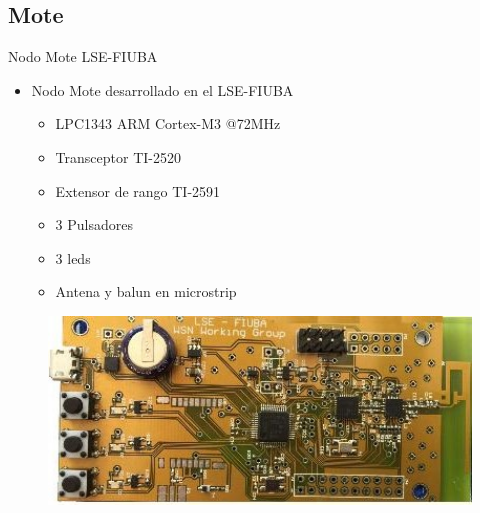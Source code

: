 \documentclass[aspectratio=169, handout]{beamer}
\begin{document}
\subsection[Mote]{Mote}
\begin{frame}{Nodo Mote LSE-FIUBA} 

\begin{minipage}[c]{1.0\linewidth}
	\begin{minipage}[c]{0.6\linewidth}
		\begin{itemize}
			\item Nodo Mote desarrollado en el LSE-FIUBA
			\vspace{15px}
			\begin{itemize}
				\item LPC1343 ARM Cortex-M3 @72MHz
				\vspace{5px}
				\item Transceptor TI-2520
				\vspace{5px}
				\item Extensor de rango TI-2591
				\vspace{5px}
				\item 3 Pulsadores
				\vspace{5px}
				\item 3 leds
				\vspace{5px}
				\item Antena y balun en microstrip
			\end{itemize}
			\vspace{10px}
		\end{itemize}
	\end{minipage}
	\begin{minipage}[c]{0.35\linewidth}
		\begin{figure}[H]
			\vspace{35px}
			\includegraphics[width=1\textwidth]{./imagenes/mote.jpg}
			\\
			\vspace{10px}

\end{figure}
\end{minipage}
\end{minipage}
\end{frame}
\end{document}
